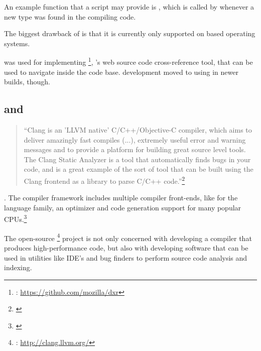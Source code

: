 An example function that a script may provide is , which is called by  whenever a new type was found in the compiling code.

The biggest drawback of  is that it is currently only supported on  based operating systems.

 was used for implementing \footnote{: \url{https://github.com/mozilla/dxr}}, 's web source code \linebreak cross-reference tool, that can be used to navigate inside the  code base.  development moved to using  in newer builds, though.

\subsection{ and }
\label{sec:Clang}

\begin{quotation}
``Clang is an 'LLVM native' C/C++/Objective-C compiler, which aims to deliver amazingly fast compiles (...), extremely useful error and warning messages and to provide a platform for building great source level tools. The Clang Static Analyzer is a tool that automatically finds bugs in your code, and is a great example of the sort of tool that can be built using the Clang frontend as a library to parse C/C++ code.''\footnote{\citep{LLVMHP}}
\end{quotation}

. The  compiler framework includes multiple compiler front-ends, like  for the  language family, an optimizer and code generation support for many popular CPUs.\footnote{\citep{LLVMHP}}

The open-source \footnote{: \url{http://clang.llvm.org/}} project is not only concerned with developing a compiler that produces high-performance code, but also with developing software that can be used in utilities like IDE's and bug finders to perform source code analysis and indexing.

